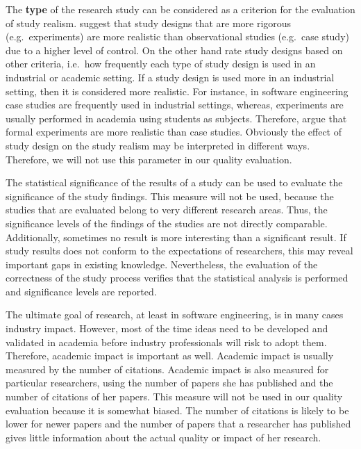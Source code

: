 The \textbf{type} of the research study can be considered as a criterion for the evaluation of study realism. \citep{Kitchenham2004} suggest that study designs that are more rigorous (e.g.\ experiments) are more realistic than observational studies (e.g.\ case study) due to a higher level of control. On the other hand \citep{Ivarsson2010} rate study designs based on other criteria, i.e.\ how frequently each type of study design is used in an industrial or academic setting. If a study design is used more in an industrial setting, then it is considered more realistic. For instance, in software engineering case studies are frequently used in industrial settings, whereas, experiments are usually performed in academia using students as subjects. Therefore, \citep{Ivarsson2010} argue that formal experiments are more realistic than case studies. Obviously the effect of study design on the study realism may be interpreted in different ways. Therefore, we will not use this parameter in our quality evaluation.

The statistical significance of the results of a study can be used to evaluate the significance of the study findings.
This measure will not be used, because the studies that are evaluated belong to very different research areas.
Thus, the significance levels of the findings of the studies are not directly comparable.
Additionally, sometimes no result is more interesting than a significant result.
If study results does not conform to the expectations of researchers, this may reveal important gaps in existing knowledge.
Nevertheless, the evaluation of the correctness of the study process verifies that the statistical analysis is performed and significance levels are reported.

The ultimate goal of research, at least in software engineering, is in many cases industry impact. However, most of the time ideas need to be developed and validated in academia before industry professionals will risk to adopt them. Therefore, academic impact is important as well. Academic impact is usually measured by the number of citations. Academic impact is also measured for particular researchers, using the number of papers she has published and the number of citations of her papers.
This measure will not be used in our quality evaluation because it is somewhat biased. The number of citations is likely to be lower for newer papers and the number of papers that a researcher has published gives little information about the actual quality or impact of her research.

